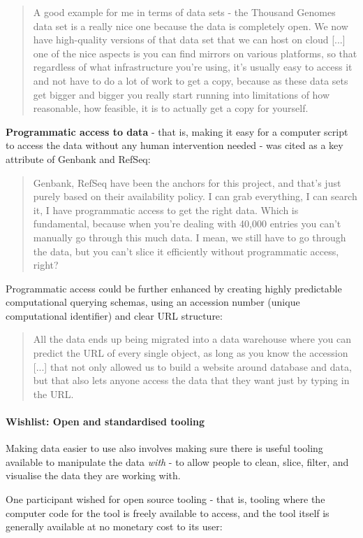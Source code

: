 \documentclass{CUP-JNL-DAP}%
\begin{document}
\blockquote{A good example for me in terms of data sets - the Thousand Genomes data set is a really nice one because the data is completely open.  We now have high-quality versions of that data set that we can host on cloud [...] one of the nice aspects is you can find mirrors on various platforms, so that regardless of what infrastructure you're using, it's usually easy to access it and not have to do a lot of work to get a copy, because as these data sets get bigger and bigger you really start running into limitations of how reasonable, how feasible, it is to actually get a copy for yourself.}

\textbf{Programmatic access to data} - that is, making it easy for a computer script to access the data without any human intervention needed - was cited as a key attribute of Genbank and RefSeq: 

\blockquote{Genbank, RefSeq have been the anchors for this project, and that's just purely based on their availability policy. I can grab everything, I can search it, I have programmatic access to get the right data. Which is fundamental, because when you're dealing with 40,000 entries you can't manually go through this much data. I mean, we still have to go through the data, but you can't slice it efficiently without programmatic access, right?}

Programmatic access could be further enhanced by creating highly predictable computational querying schemas, using an accession number (unique computational identifier) and clear URL structure: 

\blockquote{All the data ends up being migrated into a data warehouse where you can predict the URL of every single object, as long as you know the accession [...] that not only allowed us to build a website around database and data, but that also lets anyone access the data that they want just by typing in the URL.}

\paragraph{Wishlist: Open and standardised tooling}
Making data easier to use also involves making sure there is useful tooling available to manipulate the data \textit{with} - to allow people to clean, slice, filter, and visualise the data they are working with.

One participant wished for open source tooling - that is, tooling where the computer code for the tool is freely available to access, and the tool itself is generally available at no monetary cost to its user: 
\end{document}

